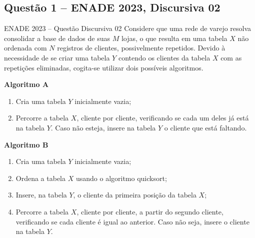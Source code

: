 \documentclass[11pt,a4paper]{article}
\begin{document}
\subsection{Questão 1 -- ENADE 2023, Discursiva 02}
\begin{enunciado}{ENADE 2023 -- Questão Discursiva 02}
Considere que uma rede de varejo resolva consolidar a base de dados de suas $M$ lojas,
o que resulta em uma tabela $X$ não ordenada com $N$ registros de clientes, possivelmente
repetidos. Devido à necessidade de se criar uma tabela $Y$ contendo os clientes da tabela
$X$ com as repetições eliminadas, cogita-se utilizar dois possíveis algoritmos.

\medskip
\textbf{Algoritmo A}
\begin{enumerate}[nosep]
  \item Cria uma tabela $Y$ inicialmente vazia;
  \item Percorre a tabela $X$, cliente por cliente, verificando se cada um deles já está
  na tabela $Y$. Caso não esteja, insere na tabela $Y$ o cliente que está faltando.
\end{enumerate}

\textbf{Algoritmo B}
\begin{enumerate}[nosep]
  \item Cria uma tabela $Y$ inicialmente vazia;
  \item Ordena a tabela $X$ usando o algoritmo quicksort;
  \item Insere, na tabela $Y$, o cliente da primeira posição da tabela $X$;
  \item Percorre a tabela $X$, cliente por cliente, a partir do segundo cliente,
  verificando se cada cliente é igual ao anterior. Caso não seja, insere o cliente na tabela $Y$.
\end{enumerate}


\end{enunciado}
\end{document}
